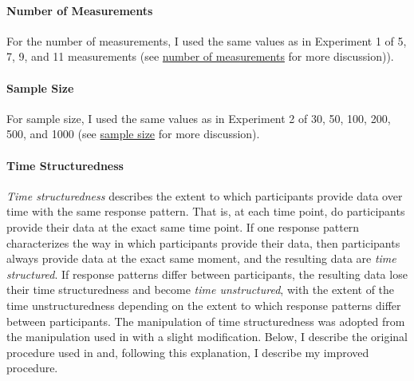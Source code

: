 \documentclass[
12pt, %
twoside,
english]{guelphthesis}
\begin{document}
\hypertarget{number-of-measurements-2}{%
\paragraph{Number of Measurements}\label{number-of-measurements-2}}

For the number of measurements, I used the same values as in Experiment 1 of 5, 7, 9, and 11 measurements (see \protect\hyperlink{number-measurements}{number of measurements} for more discussion)).

\hypertarget{sample-size-1}{%
\paragraph{Sample Size}\label{sample-size-1}}

For sample size, I used the same values as in Experiment 2 of 30, 50, 100, 200, 500, and 1000 (see \protect\hyperlink{sample-size}{sample size} for more discussion).

\hypertarget{time-structuredness-1}{%
\paragraph{Time Structuredness}\label{time-structuredness-1}}

\emph{Time structuredness} describes the extent to which participants provide data over time with the same response pattern. That is, at each time point, do participants provide their data at the exact same time point. If one response pattern characterizes the way in which participants provide their data, then participants always provide data at the exact same moment, and the resulting data are \emph{time structured}. If response patterns differ between participants, the resulting data lose their time structuredness and become \emph{time unstructured}, with the extent of the time unstructuredness depending on the extent to which response patterns differ between participants. The manipulation of time structuredness was adopted from the manipulation used in \textcite{coulombe2016} with a slight modification. Below, I describe the original procedure used in \textcite{coulombe2016} and, following this explanation, I describe my improved procedure.
\end{document}
